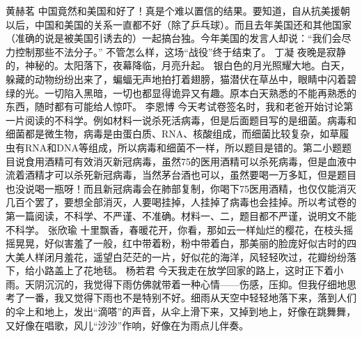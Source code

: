 {}\markdownRendererInterblockSeparator
{}黄赫茗\markdownRendererInterblockSeparator
{}中国竟然和美国和好了！真是个难以置信的结果。要知道，自从抗美援朝以后，中国和美国的关系一直都不好（除了乒乓球）。而且去年美国还和其他国家（准确的说是被美国引诱去的）一起搞台独。今年美国的发言人却说：“我们会尽力控制那些不法分子。”\markdownRendererInterblockSeparator
{}不管怎么样，这场“战役”终于结束了。\markdownRendererInterblockSeparator
{}\markdownRendererInterblockSeparator
{}丁凝\markdownRendererInterblockSeparator
{}夜晚是寂静的，神秘的。太阳落下，夜幕降临，月亮升起。\markdownRendererInterblockSeparator
{}银白色的月光照耀大地。白天，躲藏的动物纷纷出来了，蝙蝠无声地拍打着翅膀，猫潜伏在草丛中，眼睛中闪着碧绿的光。一切陷入黑暗，一切也都显得诡异又有趣。原本白天熟悉的不能再熟悉的东西，随时都有可能给人惊吓。\markdownRendererInterblockSeparator
{}\markdownRendererInterblockSeparator
{}李恩博\markdownRendererInterblockSeparator
{}今天考试卷签名时，我和老爸开始讨论第一片阅读的不科学。例如材料一说杀死活病毒，但是后面题目写的是细菌。病毒和细菌都是微生物，病毒是由蛋白质、RNA、核酸组成，而细菌比较复杂，如草履虫有RNA和DNA等组成，所以病毒和细菌不一样，所以题目是错的。第二小题题目说食用酒精可有效消灭新冠病毒，虽然75\markdownRendererPercentSign{}的医用酒精可以杀死病毒，但是血液中流着酒精才可以杀死新冠病毒，当然茅台酒也可以，虽然要喝一万多缸，但是题目也没说喝一瓶呀！而且新冠病毒会在肺部复制，你喝下75\markdownRendererPercentSign{}医用酒精，也仅仅能消灭几百个罢了，要想全部消灭，人要喝挂掉，人挂掉了病毒也会挂掉。所以考试卷的第一篇阅读，不科学、不严谨、不准确。材料一、二，题目都不严谨，说明文不能不科学。\markdownRendererInterblockSeparator
{}\markdownRendererInterblockSeparator
{}张欣瑜\markdownRendererInterblockSeparator
{}十里飘香，春暖花开，你看，那如云一样灿烂的樱花，在枝头摇摇晃晃，好似害羞了一般，红中带着粉，粉中带着白，那美丽的脸庞好似古时的四大美人样闭月羞花，遥望白茫茫的一片，好似花的海洋，风轻轻吹过，花瓣纷纷落下，给小路盖上了花地毯。\markdownRendererInterblockSeparator
{}\markdownRendererInterblockSeparator
{}杨若君\markdownRendererInterblockSeparator
{}今天我走在放学回家的路上，这时正下着小雨。天阴沉沉的，我觉得下雨仿佛就带着一种心情——伤感，压抑。但我仔细地思考了一番，我又觉得下雨也不是特别不好。细雨从天空中轻轻地落下来，落到人们的伞上和地上，发出“滴嗒”的声音，从伞上滑下来，又掉到地上，好像在跳舞舞，又好像在唱歌，风儿“沙沙”作响，好像在为雨点儿伴奏。\markdownRendererInterblockSeparator
